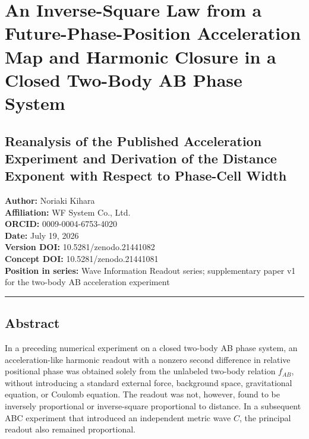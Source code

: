\documentclass[
  10pt,
  a4paper,
]{article}
\author{}
\date{}
\begin{document}
\section{An Inverse-Square Law from a Future-Phase-Position Acceleration
Map and Harmonic Closure in a Closed Two-Body AB Phase
System}\label{an-inverse-square-law-from-a-future-phase-position-acceleration-map-and-harmonic-closure-in-a-closed-two-body-ab-phase-system}

\subsection{Reanalysis of the Published Acceleration Experiment and
Derivation of the Distance Exponent with Respect to Phase-Cell
Width}\label{reanalysis-of-the-published-acceleration-experiment-and-derivation-of-the-distance-exponent-with-respect-to-phase-cell-width}

\textbf{Author:} Noriaki Kihara\\
\textbf{Affiliation:} WF System Co., Ltd.\\
\textbf{ORCID:} 0009-0004-6753-4020\\
\textbf{Date:} July 19, 2026\\
\textbf{Version DOI:} 10.5281/zenodo.21441082\\
\textbf{Concept DOI:} 10.5281/zenodo.21441081\\
\textbf{Position in series:} Wave Information Readout series;
supplementary paper v1 for the two-body AB acceleration experiment

\begin{center}\rule{0.5\linewidth}{0.5pt}\end{center}

\subsection{Abstract}\label{abstract}

In a preceding numerical experiment on a closed two-body AB phase
system, an acceleration-like harmonic readout with a nonzero second
difference in relative positional phase was obtained solely from the
unlabeled two-body relation \(f_{AB}\), without introducing a standard
external force, background space, gravitational equation, or Coulomb
equation. The readout was not, however, found to be inversely
proportional or inverse-square proportional to distance. In a subsequent
ABC experiment that introduced an independent metric wave \(C\), the
principal readout also remained proportional.
\end{document}
